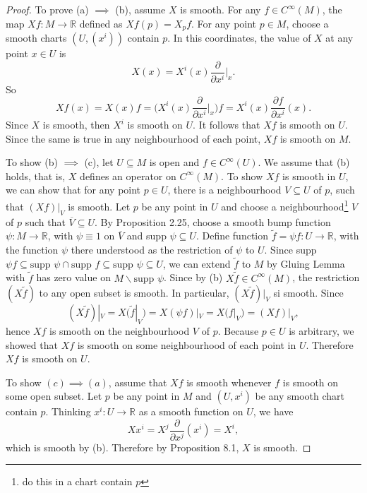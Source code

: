 \documentclass[a4paper]{article}
\theoremstyle{remark}
\newcommand{\er}{\mathbb{R}} %
\newcommand{\doo}{\partial}    %
\newcommand{\subhim}{\subseteq} %
\newcommand{\CM}{C^{\infty}(M)} %
\begin{document}
\begin{proof}
To prove (a) $\implies$ (b), assume $X$ is smooth. For any $f \in \CM$, the map $Xf : M \to \er$ defined as $Xf(p) = X_pf$. For any point $p \in M$, choose a smooth charts $(U,(x^i))$ contain $p$. In this coordinates, the value of $X$ at any point $x \in U$ is
$$
X(x) = X^i(x) \frac{\doo}{\doo x^i}\bigg|_x.
$$
So
$$
Xf(x) = X(x)f = \bigg(X^i(x) \frac{\doo}{\doo x^i}\bigg|_x \bigg)f = X^i(x) \frac{\doo f}{\doo x^i}(x).
$$
Since $X$ is smooth, then $X^i$ is smooth on $U$. It follows that $Xf$ is smooth on $U$. Since the same is true in any neighbourhood of each point, $Xf$ is smooth on $M$.

To show (b) $\implies$ (c), let $U \subhim M$ is open and $f \in C^{\infty}(U)$. We assume that (b) holds, that is, $X$ defines an operator on $\CM$. To show $Xf$ is smooth in $U$, we can show that for any point $p \in U$, there is a neighbourhood $V \subhim U$ of $p$, such that $(Xf)|_V$ is smooth. Let $p $ be any point in $U$ and choose a neighbourhood\footnote[2]{do this in a chart contain $p$} $V$ of $p$ such that $\overline{V} \subhim U$. By Proposition 2.25, choose a smooth bump function $\psi : M \to \er$, with $\psi \equiv 1$ on $\overline{V}$ and supp $\psi \subhim U$. Define function $\tilde{f} = \psi f : U \to \er$, with the function $\psi$ there understood as the restriction of $\psi$ to $U$.  Since supp $\psi f \subhim \text{supp }\psi \cap \text{supp }f \subhim \text{supp }\psi \subhim U$, we can extend $\tilde{f}$ to $M$ by Gluing Lemma with $\tilde{f}$ has zero value on $M \smallsetminus \text{supp }\psi$. Since by (b) $X\tilde{f} \in \CM$, the restriction $(X\tilde{f})$ to any open subset is smooth. In particular, $(X\tilde{f})|_V$ si smooth. Since
$$
(X\tilde{f})|_V = X(\tilde{f}|_V) = X(\psi f)|_V = X(f|_V) = (Xf)|_V,
$$
hence $Xf$ is smooth on the neighbourhood $V$ of $p$. Because $p \in U$ is arbitrary, we showed that $Xf$ is smooth on some neighbourhood of each point in $U$. Therefore $Xf$ is smooth on $U$.

To show $(c) \implies (a)$, assume that $Xf$ is smooth whenever $f$ is smooth on some open subset. Let $p$ be any point in $M$ and $(U,x^i)$ be any smooth chart contain $p$. Thinking $x^i : U \to \er$ as a smooth function on $U$, we have
$$
Xx^i = X^j \frac{\doo }{\doo x^j} (x^i) = X^i, 
$$ 
which is smooth by (b). Therefore by Proposition 8.1, $X$ is smooth.
\end{proof}
\end{document}
